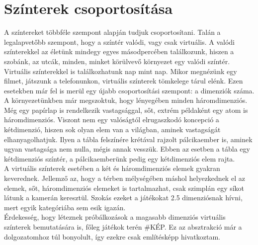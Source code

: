 \section{Színterek csoportosítása}
A színtereket többféle szempont alapján tudjuk csoportosítani. Talán a legalapvetőbb szempont, hogy a színtér valódi, vagy csak virtuális. A valódi színterekkel az életünk mindegy egyes másodpercében találkozunk, hiszen a szobánk, az utcák, minden, minket körülvevő környezet egy valódi színtér. Virtuális színterekkel is találkozhatunk nap mint nap. Mikor megnézünk egy filmet, játszunk a telefonunkon, virtuális színterek tömkelege tárul elénk. Ezen esetekben már fel is merül egy újabb csoportosítási szempont: a dimenziók száma.\\
A környezetünkben már megszoktuk, hogy lényegében minden háromdimenziós. Még egy papírlap is rendelkezik vastagsággal, sőt, extrém példaként egy atom is háromdimenziós. Viszont nem egy valóságtól elrugaszkodó koncepció a kétdimenzió, hiszen sok olyan elem van a világban, aminek vastagságát elhanyagolhatjuk. Ilyen a tábla felszínére krétával rajzolt pálcikaember is, aminek ugyan vastagsága nem nulla, mégis annak vesszük. Ebben az esetben a tábla egy kétdimenziós színtér, a pálcikaemberünk pedig egy kétdimenziós elem rajta.\\
A virtuális színterek esetében a két és háromdimenziós elemek gyakran keverednek. Jellemző az, hogy a térben mélységében máshol helyezkednek el az elemek, sőt, háromdimenziós elemeket is tartalmazhat, csak szimplán egy síkot látunk a kamerán keresztül. Szokás ezeket a játékokat 2.5 dimenziósnak hívni, mert egyik kategóriába sem esik igazán. \\
Érdekesség, hogy léteznek próbálkozások a magasabb dimenziós virtuális színterek bemutatására is, főleg játékok terén \#KÉP. Ez az absztrakció már a dolgozatomhoz túl bonyolult, így ezekre csak említésképp hivatkoztam.

